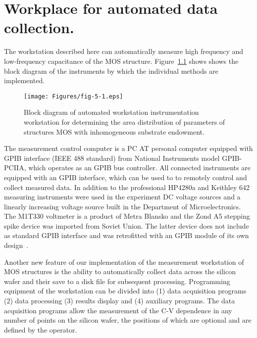 
\chapter{Workplace for automated data collection.}\label{Chapter5}

The workstation described here can automatically measure high
frequency and low-frequency capacitance of the MOS
structure. Figure~\ref{fig:5.1} shows shows the block diagram of the
instruments by which the individual methods are implemented.

\begin{figure}[h!]\centering
  \texttt{[image: Figures/fig-5-1.eps]}%
  \caption[Block diagram of automated instrumentation
    workstation]{Block diagram of automated workstation
    instrumentation workstation for determining the area distribution
    of parameters of structures MOS with inhomogeneous substrate
    endowment.}\label{fig:5.1}
\end{figure}

The measurement control computer is a PC AT personal computer equipped
with GPIB interface (IEEE 488 standard) from National Instruments
model GPIB-PCIIA, which operates as an GPIB bus controller. All
connected instruments are equipped with an GPIB interface, which can
be used to to remotely control and collect measured data. In addition
to the professional HP4280a and Keithley 642 measuring instruments
were used in the experiment DC voltage sources and a linearly
increasing voltage source built in the Department of
Microelectronics. The M1T330 voltmeter is a product of Metra Blansko
and the Zond A5 stepping spike device was imported from Soviet
Union. The latter device does not include as standard GPIB interface
and was retrofitted with an GPIB module of its own design~\cite{5.1}.

Another new feature of our implementation of the measurement
workstation of MOS structures is the ability to automatically collect
data across the silicon wafer and their save to a disk file for
subsequent processing. Programming equipment of the workstation can be
divided into (1) data acquisition programs (2) data processing (3)
results display and (4) auxiliary programs. The data acquisition
programs allow the measurement of the C-V dependence in any number of
points on the silicon wafer, the positions of which are optional and
are defined by the operator.

